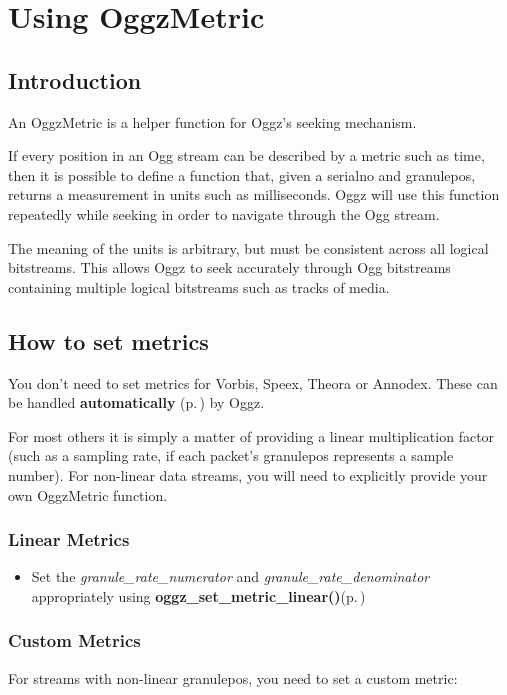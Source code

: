 \section{Using Oggz\-Metric}
\label{group__metric}
\subsection{Introduction}\label{metric_intro}
An Oggz\-Metric is a helper function for Oggz's seeking mechanism.

If every position in an Ogg stream can be described by a metric such as time, then it is possible to define a function that, given a serialno and granulepos, returns a measurement in units such as milliseconds. Oggz will use this function repeatedly while seeking in order to navigate through the Ogg stream.

The meaning of the units is arbitrary, but must be consistent across all logical bitstreams. This allows Oggz to seek accurately through Ogg bitstreams containing multiple logical bitstreams such as tracks of media.\subsection{How to set metrics}\label{setting}
You don't need to set metrics for Vorbis, Speex, Theora or Annodex. These can be handled {\bf automatically }{\rm (p.\,\pageref{group__auto})} by Oggz.

For most others it is simply a matter of providing a linear multiplication factor (such as a sampling rate, if each packet's granulepos represents a sample number). For non-linear data streams, you will need to explicitly provide your own Oggz\-Metric function.\subsubsection{Linear Metrics}\label{linear}
\begin{itemize}
\item Set the {\em granule\_\-rate\_\-numerator\/} and {\em granule\_\-rate\_\-denominator\/} appropriately using {\bf oggz\_\-set\_\-metric\_\-linear()}{\rm (p.\,\pageref{group__seek__api_ga1})}\end{itemize}
\subsubsection{Custom Metrics}\label{custom}
For streams with non-linear granulepos, you need to set a custom metric:

